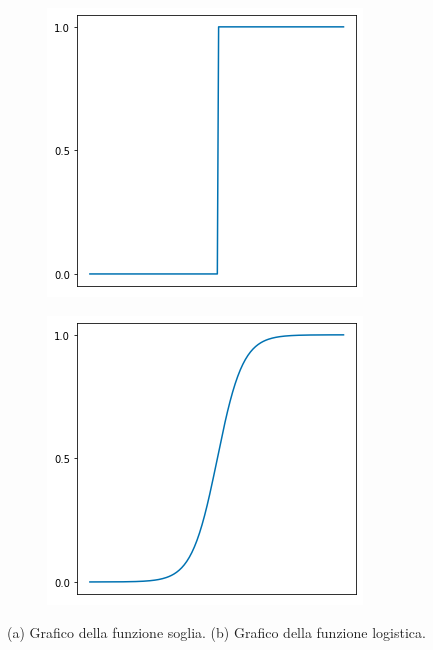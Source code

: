 \documentclass[../../main.tex]{subfiles}
\begin{document}
    \begin{figure}[H]
        \begin{subfigure}{0.5\textwidth}
            \centering
            \includegraphics[width=\textwidth]{immagini/4_1/threshold.png} 
            \caption{}
            \label{fig:threshold}
        \end{subfigure}
        \begin{subfigure}{0.5\textwidth}
            \centering
            \includegraphics[width=\textwidth]{immagini/4_1/logistic.png}
            \caption{}
            \label{fig:logistic}
        \end{subfigure}
        \caption{(a) Grafico della funzione soglia. (b) Grafico della funzione logistica.}
    \end{figure}
\end{document}

